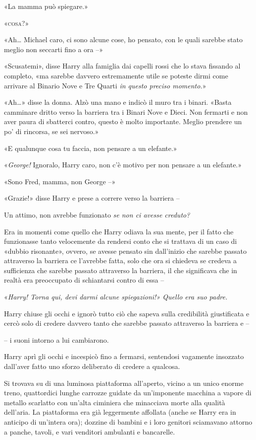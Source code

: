 «La mamma può spiegare.»

«\textsc{cosa?}»

«Ah… Michael caro, ci sono alcune cose, ho pensato, con le quali sarebbe stato meglio non seccarti fino a ora –»

«Scusatemi», disse Harry alla famiglia dai capelli rossi che lo stava fissando al completo, «ma sarebbe davvero estremamente utile se poteste dirmi come arrivare al Binario Nove e Tre Quarti \textit{in questo preciso momento.}»

«Ah…» disse la donna. Alzò una mano e indicò il muro tra i binari. «Basta camminare dritto verso la barriera tra i Binari Nove e Dieci. Non fermarti e non aver paura di sbatterci contro, questo è molto importante. Meglio prendere un po’ di rincorsa, se sei nervoso.»

«E qualunque cosa tu faccia, non pensare a un elefante.»

«\textit{George!} Ignoralo, Harry caro, non c’è motivo per non pensare a un elefante.»

«Sono Fred, mamma, non George –»

«Grazie!» disse Harry e prese a correre verso la barriera –

Un attimo, non avrebbe funzionato \textit{se non ci avesse creduto?}

Era in momenti come quello che Harry odiava la sua mente, per il fatto che funzionasse tanto velocemente da rendersi conto che si trattava di un caso di «dubbio risonante», ovvero, se avesse pensato sin dall’inizio che sarebbe passato attraverso la barriera ce l’avrebbe fatta, solo che ora si chiedeva se credeva a sufficienza che sarebbe passato attraverso la barriera, il che significava che in realtà era preoccupato di schiantarsi contro di essa –

«\textit{Harry! Torna qui, devi darmi alcune spiegazioni!» Quello era suo padre.}

Harry chiuse gli occhi e ignorò tutto ciò che sapeva sulla credibilità giustificata e cercò solo di credere davvero tanto che sarebbe passato attraverso la barriera e –

– i suoni intorno a lui cambiarono.

Harry aprì gli occhi e incespicò fino a fermarsi, sentendosi vagamente insozzato dall’aver fatto uno sforzo deliberato di credere a qualcosa.

Si trovava su di una luminosa piattaforma all’aperto, vicino a un unico enorme treno, quattordici lunghe carrozze guidate da un’imponente macchina a vapore di metallo scarlatto con un’alta ciminiera che minacciava morte alla qualità dell’aria. La piattaforma era già leggermente affollata (anche se Harry era in anticipo di un’intera ora); dozzine di bambini e i loro genitori sciamavano attorno a panche, tavoli, e vari venditori ambulanti e bancarelle.

